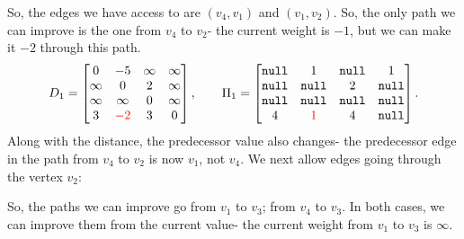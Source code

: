 \documentclass[a4paper, openany]{memoir}
\begin{document}
    \noindent So, the edges we have access to are $(v_4, v_1)$ and $(v_1, v_2)$. So, the only path we can improve is the one from $v_4$ to $v_2$- the current weight is $-1$, but we can make it $-2$ through this path.
    \[D_1 = \begin{bmatrix}
        0 & -5 & \infty & \infty \\
        \infty & 0 & 2 & \infty \\
        \infty & \infty & 0 & \infty \\
        3 & {\color{red} -2} & 3 & 0
    \end{bmatrix}, \qquad \Pi_1 = \begin{bmatrix}
        \texttt{null} & 1 & \texttt{null} & 1 \\
        \texttt{null} & \texttt{null} & 2 & \texttt{null} \\
        \texttt{null} & \texttt{null} & \texttt{null} & \texttt{null} \\
        4 & {\color{red} 1} & 4 & \texttt{null}
    \end{bmatrix}.\]
    \noindent Along with the distance, the predecessor value also changes- the predecessor edge in the path from $v_4$ to $v_2$ is now $v_1$, not $v_4$. We next allow edges going through the vertex $v_2$:
    \begin{figure}[H]
        \centering
    \end{figure}
    \noindent So, the paths we can improve go from $v_1$ to $v_3$; from $v_4$ to $v_3$. In both cases, we can improve them from the current value- the current weight from $v_1$ to $v_3$ is $\infty$. 
\end{document}
